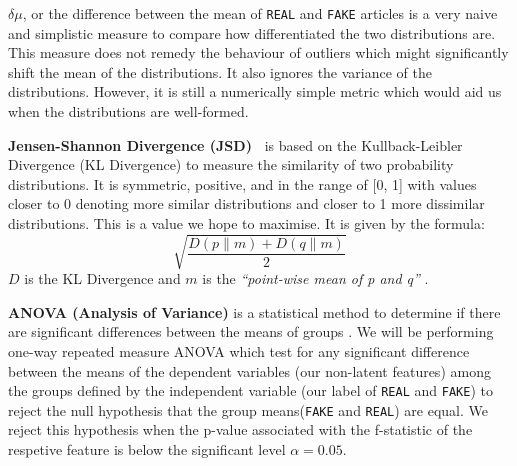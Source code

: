\documentclass{article}
\begin{document}
\textbf{$\delta \mu$}, or the difference between the mean of \texttt{REAL} and \texttt{FAKE} articles is a very naive and simplistic measure to compare how differentiated the two distributions are. This measure does not remedy the behaviour of outliers which might significantly shift the mean of the distributions. It also ignores the variance of the distributions. However, it is still a numerically simple metric which would aid us when the distributions are well-formed.

\textbf{Jensen-Shannon Divergence (JSD)~\cite{scipy}} is based on the Kullback-Leibler Divergence (KL Divergence) to measure the similarity of two probability distributions. It is symmetric, positive, and in the range of [0, 1] with values closer to 0 denoting more similar distributions and closer to 1 more dissimilar distributions. This is a value we hope to maximise. It is given by the formula:
\[\sqrt{\frac{D(p \parallel m) + D(q \parallel m)}{2}}\]
$D$ is the KL Divergence and $m$ is the \emph{``point-wise mean of p and q''} \cite{scipy}.

\textbf{ANOVA (Analysis of Variance)} is a statistical method to determine if there are significant differences between the means of groups \cite{anova}. We will be performing one-way repeated measure ANOVA which test for any significant difference between the means of the dependent variables (our non-latent features) among the groups defined by the independent variable (our label of \texttt{REAL} and \texttt{FAKE}) to reject the null hypothesis that the group means(\texttt{FAKE} and \texttt{REAL}) are equal. We reject this hypothesis when the p-value associated with the f-statistic of the respetive feature is below the significant level $\alpha = 0.05$.
\end{document}
